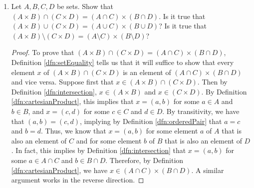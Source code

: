 \documentclass[../main.tex]{subfiles}
\begin{document}
\begin{enumerate}[ref={\thesection.\arabic*}]
\begin{proof}
\begin{align*}
            &\Longleftrightarrow x\in(A\times B)\cap(A\times C) \tag*{Definition \ref{dfn:intersection}}
        \end{align*}
        To prove that $A\times(B\setminus C)=(A\times B)\setminus(A\times C)$, Definition \ref{dfn:setEquality} tells us that it will suffice to show that $x\in A\times(B\setminus C) \Longleftrightarrow x\in(A\times B)\setminus(A\times C)$, which can be done as follows.
        \begin{align*}
            x\in A\times(B\setminus C) &\Longleftrightarrow x=(a,b)\text{ for some }a\in A\text{ and }b\in B\setminus C \tag*{Definition \ref{dfn:cartesianProduct}}\\
            &\Longleftrightarrow x=(a,b)\text{ for some }a\in A\text{ and }b\in\{y\in B:y\notin C\} \tag*{Definition \ref{dfn:differenceSets}}\\
            &\Longleftrightarrow (x=(a,b)\text{ for some }a\in A\text{ and }b\in B\text{ and }x\neq(a,b)\text{ for any }a\in A\text{ and }b\in C) \tag*{Axiom \ref{axm:specification}}\\
            &\Longleftrightarrow (x\in A\times B\text{ and }x\notin A\times C) \tag*{Definition \ref{dfn:cartesianProduct}}\\
            &\Longleftrightarrow x\in\{y\in A\times B:y\notin A\times C\} \tag*{Axiom \ref{axm:specification}}\\
            &\Longleftrightarrow x\in(A\times B)\setminus(A\times C) \tag*{Definition \ref{dfn:differenceSets}}
        \end{align*}
    \end{proof}
    \item \label{exr:3.5.5}Let $A,B,C,D$ be sets. Show that $(A\times B)\cap(C\times D)=(A\cap C)\times(B\cap D)$. Is it true that $(A\times B)\cup(C\times D)=(A\cup C)\times(B\cup D)$? Is it true that $(A\times B)\setminus(C\times D)=(A\setminus C)\times(B\setminus D)$?
    \begin{proof}
        To prove that $(A\times B)\cap(C\times D)=(A\cap C)\times(B\cap D)$, Definition \ref{dfn:setEquality} tells us that it will suffice to show that every element $x$ of $(A\times B)\cap(C\times D)$ is an element of $(A\cap C)\times(B\cap D)$ and vice versa. Suppose first that $x\in(A\times B)\cap(C\times D)$. Then by Definition \ref{dfn:intersection}, $x\in(A\times B)$ and $x\in(C\times D)$. By Definition \ref{dfn:cartesianProduct}, this implies that $x=(a,b)$ for some $a\in A$ and $b\in B$, and $x=(c,d)$ for some $c\in C$ and $d\in D$. By transitivity, we have that $(a,b)=(c,d)$, implying by Definition \ref{dfn:orderedPair} that $a=c$ and $b=d$. Thus, we know that $x=(a,b)$ for some element $a$ of $A$ that is also an element of $C$ and for some element $b$ of $B$ that is also an element of $D$. In fact, this implies by Definition \ref{dfn:intersection} that $x=(a,b)$ for some $a\in A\cap C$ and $b\in B\cap D$. Therefore, by Definition \ref{dfn:cartesianProduct}, we have $x\in(A\cap C)\times(B\cap D)$. A similar argument works in the reverse direction.\par

\end{proof}
\end{enumerate}
\end{document}
